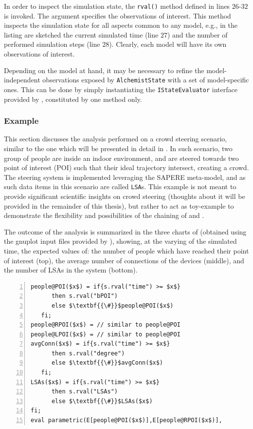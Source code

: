 \documentclass[12pt,a4paper,twoside,openright]{book}
\begin{document}
In order to inspect the simulation state, the \texttt{rval()} method defined in lines $26$-$32$ is invoked.
%
The argument specifies the observations of interest.
%
This method inspects the simulation state for all aspects common to any \alchemist{} model, e.g., in the listing are sketched the current simulated time (line $27$) and the number of performed simulation steps (line $28$).
%
Clearly, each \alchemist{} model will have its own observations of interest.

Depending on the model at hand, it may be necessary to refine the model-independent observations exposed by \texttt{AlchemistState} with a set of model-specific ones. This can be done by simply instantiating the \texttt{IStateEvaluator} interface provided by \multivesta, constituted by one method only.

\subsubsection{Example}

This section discusses the analysis performed on a crowd steering scenario, similar to the one which will be presented in detail in .
%
In such scenario, two group of people are inside an indoor environment, and are steered towards two point of interest (POI) such that their ideal trajectory intersect, creating a crowd.
%
The steering system is implemented leveraging the SAPERE meta-model, and as such data items in this scenario are called \texttt{LSA}s.
%
This example is not meant to provide significant scientific insights on crowd steering (thoughts about it will be provided in the remainder of this thesis), but rather to act as toy-example to demonstrate the flexibility and possibilities of the chaining of \alchemist{} and \multivesta{}.

The outcome of the analysis is summarized in the three charts of  (obtained using the gnuplot input files provided by \multivesta{}), showing, at the varying of the simulated time, the expected values of: the number of people which have reached their point of interest (top), the average number of connections of the devices (middle), and the number of LSAs in the system (bottom).

\lstset{caption=The evaluated parametric multi-expression ($MainMQ$), label=listing:parametricMQ}
\begin{lstlisting}[frame=single, mathescape, morekeywords={parametric,eval,E,if,fi,then,else,s,rval,evalME,evalOnceME}, float=t, numbers=left]
people@POI($x$) = if{s.rval("time") >= $x$}
      then s.rval("bPOI")
      else $\textbf{{\#}}$people@POI($x$)
   fi;
people@RPOI($x$) = // similar to people@POI
people@LPOI($x$) = // similar to people@POI
avgConn($x$) = if{s.rval("time") >= $x$}
      then s.rval("degree")
      else $\textbf{{\#}}$avgConn($x$)
   fi;
LSAs($x$) = if{s.rval("time") >= $x$}
      then s.rval("LSAs") 
      else $\textbf{{\#}}$LSAs($x$)
fi;
eval parametric(E[people@POI($x$)],E[people@RPOI($x$)],              E[people@LPOI($x$)],E[avgConn($x$)],E[LSAs($x$)],$x$,$0.0$,$1.0$,$50.0$);
\end{lstlisting}
\end{document}
